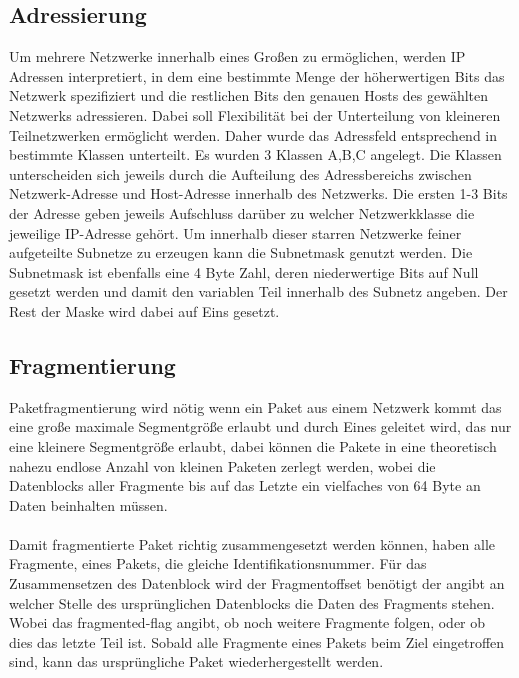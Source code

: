 \subsection{Adressierung}
Um mehrere Netzwerke innerhalb eines Großen zu ermöglichen, werden IP Adressen interpretiert, in dem eine bestimmte Menge der höherwertigen Bits das Netzwerk spezifiziert und die restlichen Bits den genauen Hosts des gewählten Netzwerks adressieren. Dabei soll Flexibilität bei der Unterteilung von kleineren Teilnetzwerken ermöglicht werden. Daher wurde das Adressfeld entsprechend in bestimmte Klassen unterteilt. Es wurden 3 Klassen A,B,C angelegt. Die Klassen unterscheiden sich jeweils durch die Aufteilung des Adressbereichs zwischen Netzwerk-Adresse und Host-Adresse innerhalb des Netzwerks. Die ersten 1-3 Bits der Adresse geben jeweils Aufschluss darüber zu welcher Netzwerkklasse die jeweilige IP-Adresse gehört. Um innerhalb dieser starren Netzwerke feiner aufgeteilte Subnetze zu erzeugen kann die Subnetmask genutzt werden. Die Subnetmask ist ebenfalls eine 4 Byte Zahl, deren niederwertige Bits auf Null gesetzt werden und damit den variablen Teil innerhalb des Subnetz angeben. Der Rest der Maske wird dabei auf Eins gesetzt.


\subsection{Fragmentierung}

Paketfragmentierung wird nötig wenn ein Paket aus einem Netzwerk kommt das eine große maximale Segmentgröße erlaubt und durch Eines geleitet wird, das nur eine kleinere Segmentgröße erlaubt, dabei können die Pakete in eine theoretisch nahezu endlose Anzahl von kleinen Paketen zerlegt werden, wobei die Datenblocks aller Fragmente bis auf das Letzte ein vielfaches von 64 Byte an Daten beinhalten müssen.\\\\
Damit fragmentierte Paket richtig zusammengesetzt werden können, haben alle Fragmente, eines Pakets, die gleiche Identifikationsnummer. Für das Zusammensetzen des Datenblock wird der Fragmentoffset benötigt der angibt an welcher Stelle des ursprünglichen Datenblocks die Daten des Fragments stehen. Wobei das fragmented-flag angibt, ob noch weitere Fragmente folgen, oder ob dies das letzte Teil ist. Sobald alle Fragmente eines Pakets beim Ziel eingetroffen sind, kann das ursprüngliche Paket wiederhergestellt werden. 
\clearpage 

